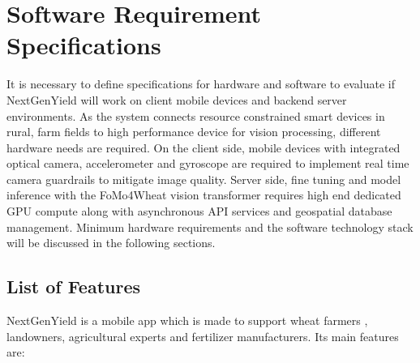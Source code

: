 \documentclass{FastFyp}
\begin{document}
\chapter{Software Requirement Specifications}
It is necessary to define specifications for hardware and software to evaluate if NextGenYield will work on client mobile devices and backend server environments. As the system connects resource constrained smart devices in rural, farm fields to high performance device for vision processing, different hardware needs are required. On the client side, mobile devices with integrated optical camera, accelerometer and gyroscope are required to implement real time camera guardrails to mitigate image quality. Server side, fine tuning and model inference with the FoMo4Wheat vision transformer requires high end dedicated GPU compute along with asynchronous API services and geospatial database management. Minimum hardware requirements and the software technology stack will be discussed in the following sections.

\section{List of Features}
NextGenYield is a mobile app which is made to support wheat farmers , landowners, agricultural experts and fertilizer manufacturers. Its main features are:
\end{document}
